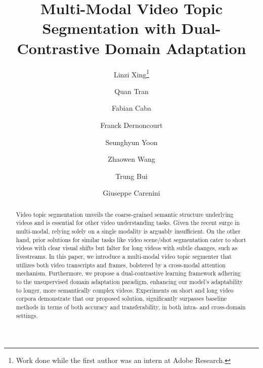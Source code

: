 \documentclass[runningheads]{llncs}
\begin{document}
%
\title{Multi-Modal Video Topic Segmentation with Dual-Contrastive Domain Adaptation}
%
%
\author{Linzi Xing\thanks{Work done while the first author was an intern at Adobe Research.} \and
Quan Tran \and
Fabian Caba \and
Franck Dernoncourt \and
Seunghyun Yoon \and
Zhaowen Wang \and
Trung Bui \and
Giuseppe Carenini
}
%
%
%
\maketitle              %
%
\begin{abstract}
Video topic segmentation unveils the coarse-grained semantic structure underlying videos and is essential for other video understanding tasks. Given the recent surge in multi-modal, relying solely on a single modality is arguably insufficient. On the other hand, prior solutions for similar tasks like video scene/shot segmentation cater to short videos with clear visual shifts but falter for long videos with subtle changes, such as livestreams. In this paper, we
introduce a multi-modal video topic segmenter that utilizes both video transcripts and frames, bolstered by a cross-modal attention mechanism. Furthermore, we propose a dual-contrastive learning framework adhering to the unsupervised domain adaptation paradigm, enhancing our model's adaptability to longer, more semantically complex videos. Experiments on short and long video corpora demonstrate that our proposed solution, significantly surpasses baseline methods in terms of both accuracy and transferability, in both intra- and cross-domain settings.

\end{abstract}
%
%
%
\end{document}
